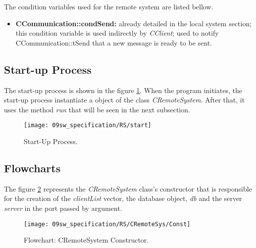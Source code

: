 
The condition variables used for the remote system are listed bellow.

\begin{itemize}
	\item \textbf{CCommunication::condSend:} already detailed in the local system
	section; this condition variable is used indirectly by \textit{CClient}; used to notify CCommunication::tSend that a new message is ready to be sent.
\end{itemize}


\subsection{Start-up Process}
The start-up process is shown in the figure \ref{fig:RSstart}. When the program initiates, the start-up process instantiate a object of the class \textit{CRemoteSystem}. After that, it uses the method \textit{run} that will be seen in the next subsection.

\begin{figure}[H]
	\centering
	\texttt{[image: 09sw\_specification/RS/start]}
	\caption{Start-Up Process.}
	\label{fig:RSstart}
\end{figure}

\clearpage
\subsection{Flowcharts}

The figure \ref{fig:rsConst} represents the \textit{CRemoteSystem} class's constructor that is responsible for the creation of the \textit{clientList} vector, the database object, \textit{db} and the server \textit{server} in the port passed by argument.

\begin{figure}[H]
	\centering
	\texttt{[image: 09sw\_specification/RS/CRemoteSys/Const]}
	\caption{Flowchart: CRemoteSystem Constructor.}
	\label{fig:rsConst}
\end{figure}

